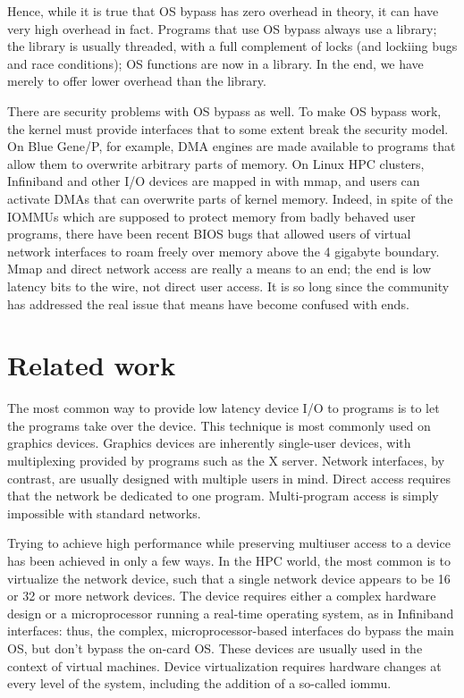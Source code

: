\documentclass[letterpaper]{article}
\begin{document}
Hence, while it is true that OS bypass has zero overhead in theory, it can have very high overhead in fact. 
Programs that use OS bypass always use a library; the library is usually threaded, with a full complement of locks (and 
lockiing bugs and race conditions); OS functions are now in a library. In the end, we have merely to offer lower overhead than the library. 

There are security problems with OS bypass as well. 
To make OS bypass work, the kernel must provide interfaces that to some extent break the security model. On Blue Gene/P, for 
example, DMA engines  are made available to programs  that allow them to overwrite arbitrary parts of memory. On Linux HPC clusters, 
Infiniband and other I/O devices are mapped in with mmap, and users can activate DMAs that can overwrite parts of kernel memory. Indeed, 
in spite of the IOMMUs which are supposed to protect memory from badly behaved user programs, 
there have been recent BIOS bugs that allowed users of virtual network interfaces to roam freely over memory above the 4 gigabyte
boundary. Mmap and direct network access are  really  a 
means to an end; the end is low latency bits to the wire, not direct user access. It is so long 
since the community has addressed the real issue that means have become confused with ends. 

\section{Related work}
The most common way to provide low latency device I/O 
to programs is to let the programs take over the device. 
This technique is most commonly used on graphics devices. Graphics devices are inherently single-user devices, with multiplexing 
provided by programs such as the X server. Network interfaces, by contrast, are usually designed with multiple users in mind. 
Direct access requires that the network be dedicated to one program. Multi-program access is simply impossible with 
standard networks. 

Trying to achieve high performance while preserving multiuser access to a device 
has been achieved in only a few ways. In the HPC world, 
the most common is to virtualize the network device, such 
that a single network device appears to be 16 or 32 or more network devices. The device 
requires either a complex hardware design or a microprocessor running a real-time operating system, as in 
Infiniband interfaces: thus, the complex, microprocessor-based interfaces do bypass the main OS, 
but don't bypass the on-card OS. 
These devices are usually 
used in the context of virtual machines. Device virtualization  requires hardware changes at every level of the system, including
the addition of a so-called iommu\cite{iommu}. 
\end{document}
